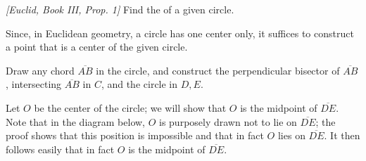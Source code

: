 \documentclass[12pt]{article}
\newcommand{\ol}{\overline}
\begin{document}
\emph{[Euclid, Book III, Prop. 1]} Find the  of a given circle.

Since, in Euclidean geometry, a circle has one center only, it suffices to construct a point that is a center of the given circle.

Draw any chord $\ol{AB}$ in the circle, and construct the perpendicular bisector of $\ol{AB}$, intersecting $\ol{AB}$ in $C$, and the circle in $D,E$. 

Let $O$ be the center of the circle; we will show that $O$ is the midpoint of $\ol{DE}$. Note that in the diagram below, $O$ is purposely drawn not to lie on $\ol{DE}$; the proof shows that this position is impossible and that in fact $O$ lies on $\ol{DE}$. It then follows easily that in fact $O$ is the midpoint of $\ol{DE}$. 
\end{document}

